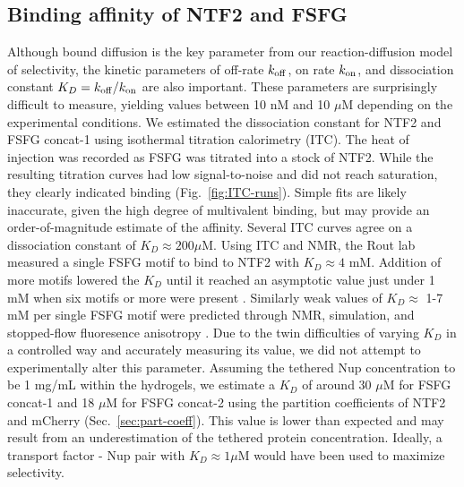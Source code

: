 \subsection{Binding affinity of NTF2 and FSFG}
Although bound diffusion is the key parameter from our reaction-diffusion model of selectivity, the kinetic parameters of off-rate $k_{\rm off}$, on rate $k_{\rm on}$, and dissociation constant $K_D = k_{\rm off}/k_{\rm on}$ are also important. These parameters are surprisingly difficult to measure, yielding values between 10 nM and 10 $\mu$M depending on the experimental conditions.  We estimated the dissociation constant for NTF2 and FSFG concat-1 using isothermal titration calorimetry (ITC).  The heat of injection was recorded as FSFG was titrated into a stock of NTF2.  While the resulting titration curves had low signal-to-noise and did not reach saturation, they clearly indicated binding (Fig.~\ref{fig:ITC-runs}).  Simple fits are likely inaccurate, given the high degree of multivalent binding, but may provide an order-of-magnitude estimate of the affinity.  Several ITC curves agree on a dissociation constant of $K_D \approx 200 \mu$M.  Using ITC and NMR, the Rout lab measured a single FSFG motif to bind to NTF2 with $K_D\approx 4$ mM.  Addition of more motifs lowered the $K_D$ until it reached an asymptotic value just under 1 mM when six motifs or more were present \cite{hayama18}.   Similarly weak values of $K_D \approx$ 1-7 mM per single FSFG motif were predicted through NMR, simulation, and stopped-flow fluoresence anisotropy \cite{milles15}.  Due to the twin difficulties of varying $K_D$ in a controlled way and accurately measuring its value, we did not attempt to experimentally alter this parameter.  Assuming the tethered Nup concentration to be 1 mg/mL within the hydrogels, we estimate a $K_D$ of around 30 $\mu$M for FSFG concat-1 and 18 $\mu$M for FSFG concat-2 using the partition coefficients of NTF2 and mCherry (Sec.~\ref{sec:part-coeff}).  This value is lower than expected and may result from an underestimation of the tethered protein concentration.  Ideally, a transport factor - Nup pair with $K_D \approx 1 \mu$M would have been used to maximize selectivity.

